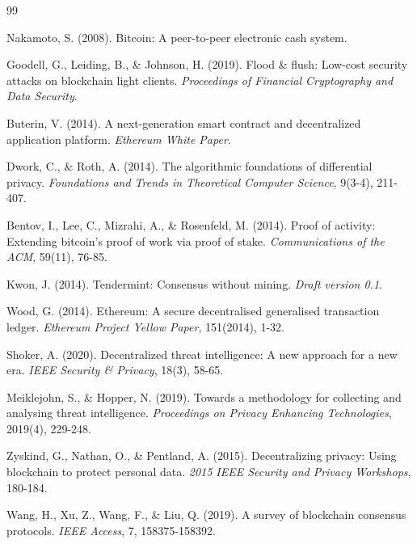 \documentclass[12pt]{article}
\begin{document}
\begin{thebibliography}{99}

Nakamoto, S. (2008). 
\newblock Bitcoin: A peer-to-peer electronic cash system.



Goodell, G., Leiding, B., \& Johnson, H. (2019). 
\newblock Flood \& flush: Low-cost security attacks on blockchain light clients. 
\newblock \textit{Proceedings of Financial Cryptography and Data Security}.

Buterin, V. (2014). 
\newblock A next-generation smart contract and decentralized application platform. 
\newblock \textit{Ethereum White Paper}.



Dwork, C., \& Roth, A. (2014). 
\newblock The algorithmic foundations of differential privacy. 
\newblock \textit{Foundations and Trends in Theoretical Computer Science}, 9(3-4), 211-407.

Bentov, I., Lee, C., Mizrahi, A., \& Rosenfeld, M. (2014). 
\newblock Proof of activity: Extending bitcoin's proof of work via proof of stake. 
\newblock \textit{Communications of the ACM}, 59(11), 76-85.

Kwon, J. (2014). 
\newblock Tendermint: Consensus without mining. 
\newblock \textit{Draft version 0.1}.

Wood, G. (2014). 
\newblock Ethereum: A secure decentralised generalised transaction ledger. 
\newblock \textit{Ethereum Project Yellow Paper}, 151(2014), 1-32.

Shoker, A. (2020). 
\newblock Decentralized threat intelligence: A new approach for a new era. 
\newblock \textit{IEEE Security \& Privacy}, 18(3), 58-65.

Meiklejohn, S., \& Hopper, N. (2019). 
\newblock Towards a methodology for collecting and analysing threat intelligence. 
\newblock \textit{Proceedings on Privacy Enhancing Technologies}, 2019(4), 229-248.



Zyskind, G., Nathan, O., \& Pentland, A. (2015). 
\newblock Decentralizing privacy: Using blockchain to protect personal data. 
\newblock \textit{2015 IEEE Security and Privacy Workshops}, 180-184.

Wang, H., Xu, Z., Wang, F., \& Liu, Q. (2019). 
\newblock A survey of blockchain consensus protocols. 
\newblock \textit{IEEE Access}, 7, 158375-158392.



\end{thebibliography}
\end{document}
